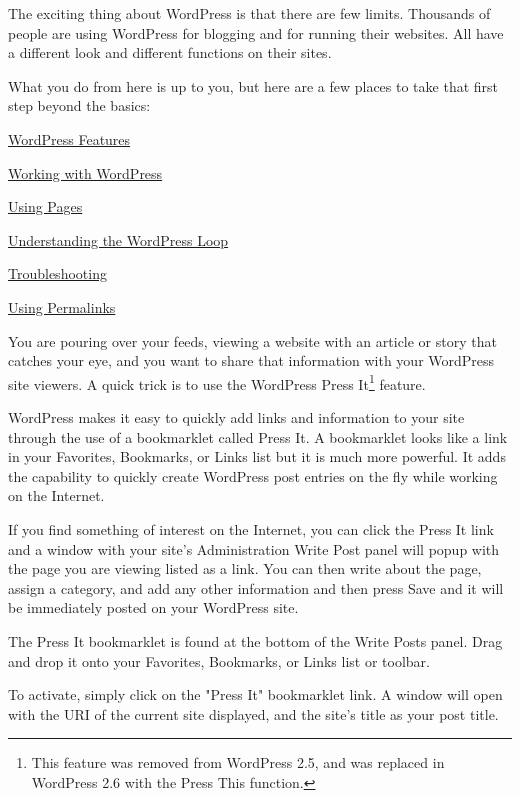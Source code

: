 The exciting thing about WordPress is that there are few limits. Thousands of people are using WordPress for blogging and for running their websites. All have a different look and different functions on their sites.

What you do from here is up to you, but here are a few places to take that first step beyond the basics:
\begin{compactitem}
\item \href{http://codex.wordpress.org/WordPress_Features}{WordPress Features}
\item \href{http://codex.wordpress.org/Working_with_WordPress}{Working with WordPress}
\item \href{http://codex.wordpress.org/Pages}{Using Pages}
\item \href{http://codex.wordpress.org/The_Loop}{Understanding the WordPress Loop}
\item \href{http://codex.wordpress.org/Troubleshooting}{Troubleshooting}
\item \href{http://codex.wordpress.org/Using_Permalinks}{Using Permalinks}
\end{compactitem}

You are pouring over your feeds, viewing a website with an article or story that catches your eye, and you want to share that information with your WordPress site viewers. A quick trick is to use the WordPress Press It\footnote{This feature was removed from WordPress 2.5, and was replaced in WordPress 2.6 with the Press This function.} feature.

WordPress makes it easy to quickly add links and information to your site through the use of a bookmarklet called Press It. A bookmarklet looks like a link in your Favorites, Bookmarks, or Links list but it is much more powerful. It adds the capability to quickly create WordPress post entries on the fly while working on the Internet.

If you find something of interest on the Internet, you can click the Press It link and a window with your site's Administration Write Post panel will popup with the page you are viewing listed as a link. You can then write about the page, assign a category, and add any other information and then press Save and it will be immediately posted on your WordPress site.

The Press It bookmarklet is found at the bottom of the Write Posts panel. Drag and drop it onto your Favorites, Bookmarks, or Links list or toolbar.

To activate, simply click on the "Press It" bookmarklet link. A window will open with the URI of the current site displayed, and the site's title as your post title.

